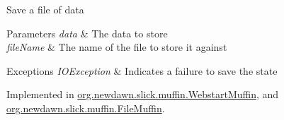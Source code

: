 Save a file of data


\begin{DoxyParams}{Parameters}
{\em data} & The data to store \\
\hline
{\em file\+Name} & The name of the file to store it against \\
\hline
\end{DoxyParams}

\begin{DoxyExceptions}{Exceptions}
{\em I\+O\+Exception} & Indicates a failure to save the state \\
\hline
\end{DoxyExceptions}


Implemented in \mbox{\hyperlink{classorg_1_1newdawn_1_1slick_1_1muffin_1_1_webstart_muffin_a4109511b5120d8588fcb4543202d9763}{org.\+newdawn.\+slick.\+muffin.\+Webstart\+Muffin}}, and \mbox{\hyperlink{classorg_1_1newdawn_1_1slick_1_1muffin_1_1_file_muffin_ade293cc9f254442a763d22c2b0988aad}{org.\+newdawn.\+slick.\+muffin.\+File\+Muffin}}.

